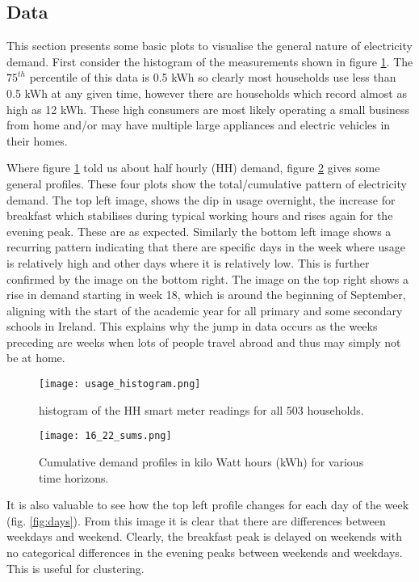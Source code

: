 \documentclass[a4paper]{article}
\begin{document}
\subsection{Data}
\label{subsec:basic} 
This section presents some basic plots to visualise the general nature of electricity demand. First consider the histogram of the measurements shown in figure \ref{fig:hist}. The $75^{th}$ percentile of this data is 0.5 kWh so clearly most households use less than 0.5 kWh at any given time, however there are households which record almost as high as 12 kWh. These high consumers are most likely operating a small business from home and/or may have multiple large appliances and electric vehicles in their homes.

Where figure \ref{fig:hist} told us about half hourly (HH) demand, figure \ref{fig:sums} gives some general profiles. These four plots show the total/cumulative pattern of electricity demand. The top left image, shows the dip in usage overnight, the increase for breakfast which stabilises during typical working hours and rises again for the evening peak. These are as expected. Similarly the bottom left image shows a recurring pattern indicating that there are specific days in the week where usage is relatively high and other days where it is relatively low. This is further confirmed by the image on the bottom right. The image on the top right shows a rise in demand starting in week 18, which is around the beginning of September, aligning with the start of the academic year for all primary and some secondary schools in Ireland. This explains why the jump in data occurs as the weeks preceding are weeks when lots of people travel abroad and thus may simply not be at home.

\begin{figure}
\centering
\texttt{[image: usage\_histogram.png]}
\caption{histogram of the HH smart meter readings for all 503 households.}
\label{fig:hist} 
\end{figure}

\begin{figure}
\centering
\texttt{[image: 16\_22\_sums.png]}
\caption{Cumulative demand profiles in kilo Watt hours (kWh) for various time horizons.}
\label{fig:sums} 
\end{figure}

It is also valuable to see how the top left profile changes for each day of the week (fig. \ref{fig:days}). From this image it is clear that there are differences between weekdays and weekend. Clearly, the breakfast peak is delayed on weekends with no categorical differences in the evening peaks between weekends and weekdays. This is useful for clustering.
\end{document}
